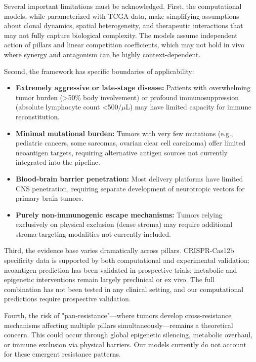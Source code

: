 \documentclass[12pt,a4paper]{article}
\begin{document}
Several important limitations must be acknowledged. First, the computational models, while parameterized with TCGA data, make simplifying assumptions about clonal dynamics, spatial heterogeneity, and therapeutic interactions that may not fully capture biological complexity. The models assume independent action of pillars and linear competition coefficients, which may not hold in vivo where synergy and antagonism can be highly context-dependent.

Second, the framework has specific boundaries of applicability:
\begin{itemize}
    \item \textbf{Extremely aggressive or late-stage disease:} Patients with overwhelming tumor burden (>50\% body involvement) or profound immunosuppression (absolute lymphocyte count <500/$\mu$L) may have limited capacity for immune reconstitution.
    \item \textbf{Minimal mutational burden:} Tumors with very few mutations (e.g., pediatric cancers, some sarcomas, ovarian clear cell carcinoma) offer limited neoantigen targets, requiring alternative antigen sources not currently integrated into the pipeline.
    \item \textbf{Blood-brain barrier penetration:} Most delivery platforms have limited CNS penetration, requiring separate development of neurotropic vectors for primary brain tumors.
    \item \textbf{Purely non-immunogenic escape mechanisms:} Tumors relying exclusively on physical exclusion (dense stroma) may require additional stroma-targeting modalities not currently included.
\end{itemize}

Third, the evidence base varies dramatically across pillars. CRISPR-Cas12b specificity data is supported by both computational and experimental validation; neoantigen prediction has been validated in prospective trials; metabolic and epigenetic interventions remain largely preclinical or ex vivo. The full combination has not been tested in any clinical setting, and our computational predictions require prospective validation.

Fourth, the risk of "pan-resistance"—where tumors develop cross-resistance mechanisms affecting multiple pillars simultaneously—remains a theoretical concern. This could occur through global epigenetic silencing, metabolic overhaul, or immune exclusion via physical barriers. Our models currently do not account for these emergent resistance patterns.
\end{document}
